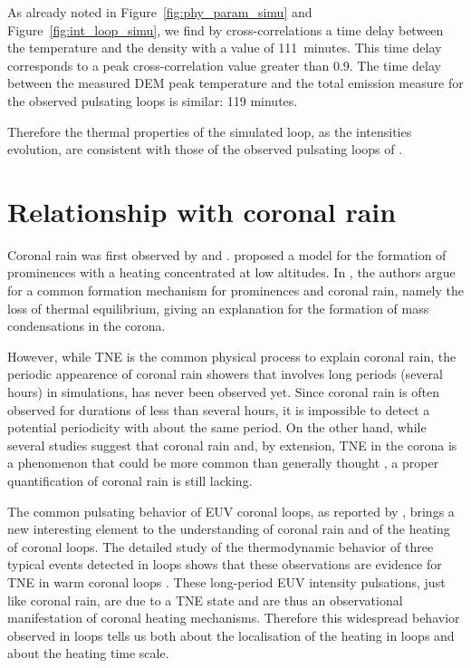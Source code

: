 \documentclass[preprint2]{aastex6}
\begin{document}
As already noted in Figure~\ref{fig:phy_param_simu} and Figure~\ref{fig:int_loop_simu}, we find by cross-correlations a time delay between the temperature and the density with a value of 111~minutes. This time delay corresponds to a peak cross-correlation value greater than 0.9. The time delay between the measured DEM peak temperature and the total emission measure for the observed pulsating loops \citep{froment2015} is similar: 119 minutes.

Therefore the thermal properties of the simulated loop, as the intensities evolution,  are consistent with those of the observed pulsating loops of \citet{froment2015}.


\section{Relationship with coronal rain}\label{sec:discussion}

Coronal rain was first observed by \citet{kawaguchi1970} and \citet{leroy1972}. \citet{antiochos1991} proposed a model for the formation of prominences with a heating concentrated at low altitudes. In \citet{antiochos1999}, the authors argue for a common formation mechanism for prominences and coronal rain, namely the loss of thermal equilibrium, giving an explanation for the formation of mass condensations in the corona.

However, while TNE is the common physical process to explain coronal rain, the periodic appearence of coronal rain showers that involves long periods (several hours) in simulations, has never been observed yet. Since coronal rain is often observed for durations of less than several hours, it is impossible to detect a potential periodicity with about the same period.
On the other hand, while several studies suggest that coronal rain and, by extension, TNE in the corona is a phenomenon that could be more common than generally thought \citep[e.g.,][]{antolin_observing_2012,antolin2012,antolin2015}, a proper quantification of coronal rain is still lacking.

The common pulsating behavior of EUV coronal loops, as reported by \citet{auchere2014}, brings a new interesting element to the understanding of coronal rain and of the heating of coronal loops. The detailed study of the thermodynamic behavior of three typical events detected in loops shows that these observations are evidence for TNE in warm coronal loops \citep{froment2015, auchere2016b}. These long-period EUV intensity pulsations, just like coronal rain, are due to a TNE state and are thus an observational manifestation of coronal heating mechanisms. Therefore this widespread behavior observed in loops tells us both about the localisation of the heating in loops and about the heating time scale. 
\end{document}

